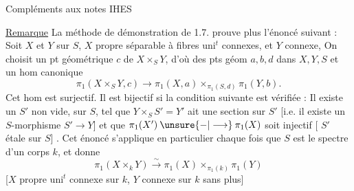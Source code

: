 Compléments aux notes IHES

\uline{Remarque} La méthode de démonstration de 1.7. prouve plus
 l'énoncé suivant : Soit $X$ et $Y$ sur $S$,
$X$ propre  séparable à fibres
$\mathrm{uni}^t$ connexes, et $Y$ connexe,
On choisit un pt géométrique $c$ de $X\times_S Y$, d'où des pts géom
$a,b,d$ dans $X,Y,S$ et un hom canonique
\[
\pi_1(X\times_S Y,c)\longrightarrow
\pi_1(X,a)\mathbin{\times_{\pi_1(S,d)}}\pi_1(Y,b).
\]
Cet hom est surjectif. 
Il est bijectif si
la condition suivante est vérifiée : Il existe un $S'$
non vide,  sur $S$, tel que
$Y\times_S S'=Y'$ ait une section sur $S'$
[i.e.  il existe un $S$-morphisme $S'\to Y$]
et que $\pi_1(X')\mathbin{\unsure{-|\longrightarrow}}\pi_1(X)$ soit
injectif [ $S'$ étale sur $S$]
.
Cet énoncé s'applique en particulier chaque fois que $S$ est le spectre
d'un corps $k$, et donne
\[
\pi_1(X\times_k Y)\xrightarrow{\sim}
\pi_1(X)\mathbin{\times_{\pi_1(k)}}\pi_1(Y)
\]
[$X$ propre $\mathrm{uni}^t$ connexe sur $k$, $Y$
 connexe sur $k$ sans plus]

